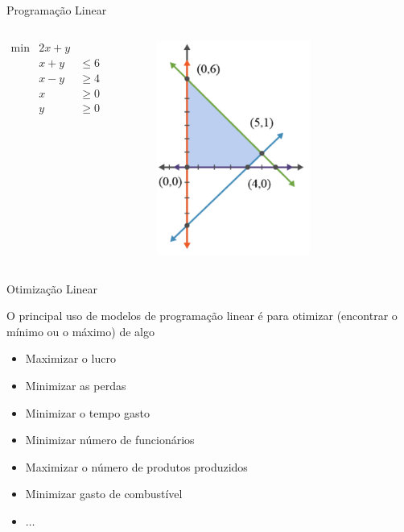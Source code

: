 \documentclass[compress]{beamer}
\begin{document}
\begin{frame}{Programação Linear}

\begin{columns}[T]
    \begin{column}{.3\textwidth}
        \vspace{1.8cm}
        $\begin{matrix}
        \min & 2x + y\\ 
             & x + y & \leq 6 \\ 
             & x - y & \geq 4 \\ 
             & x & \geq 0\\ 
             & y & \geq 0
        \end{matrix}    
        $
    \end{column}
    \begin{column}{.68\textwidth}
        \centering \includegraphics[width=0.6\textwidth]{images/modelo_pl.png}
    \end{column}
\end{columns}

\end{frame}


\begin{frame}{Otimização Linear}

O principal uso de modelos de programação linear é para otimizar (encontrar o mínimo ou o máximo) de algo
\begin{itemize}
    \item Maximizar o lucro
    \item Minimizar as perdas
    \item Minimizar o tempo gasto
    \item Minimizar número de funcionários
    \item Maximizar o número de produtos produzidos
    \item Minimizar gasto de combustível
    \item $\ldots$
\end{itemize}
\end{frame}
\end{document}
